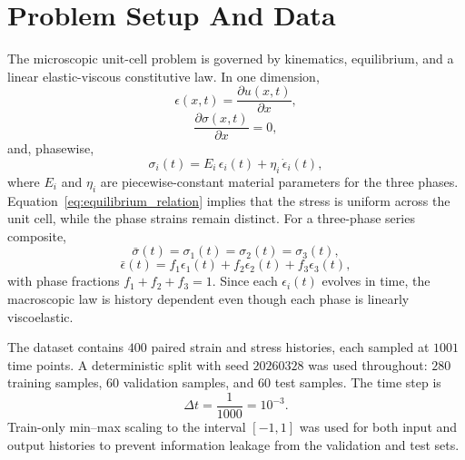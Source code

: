 \documentclass[11pt,a4paper]{article}
\newcommand{\epsbar}{\bar{\epsilon}}
\newcommand{\sigbar}{\bar{\sigma}}
\newcommand{\dt}{\Delta t}
\begin{document}
\section{Problem Setup And Data}

The microscopic unit-cell problem is governed by kinematics, equilibrium, and a linear elastic-viscous constitutive law. In one dimension,
\begin{equation}
\epsilon(x,t)=\frac{\partial u(x,t)}{\partial x},
\label{eq:kinematic_relation}
\end{equation}
\begin{equation}
\frac{\partial \sigma(x,t)}{\partial x}=0,
\label{eq:equilibrium_relation}
\end{equation}
and, phasewise,
\begin{equation}
\sigma_i(t)=E_i\,\epsilon_i(t)+\eta_i\,\dot{\epsilon}_i(t),
\label{eq:kelvin_voigt_phase}
\end{equation}
where $E_i$ and $\eta_i$ are piecewise-constant material parameters for the three phases. Equation~\eqref{eq:equilibrium_relation} implies that the stress is uniform across the unit cell, while the phase strains remain distinct. For a three-phase series composite,
\begin{equation}
\sigbar(t)=\sigma_1(t)=\sigma_2(t)=\sigma_3(t),
\label{eq:uniform_stress}
\end{equation}
\begin{equation}
\epsbar(t)=f_1\epsilon_1(t)+f_2\epsilon_2(t)+f_3\epsilon_3(t),
\label{eq:macro_strain_average}
\end{equation}
with phase fractions $f_1+f_2+f_3=1$. Since each $\epsilon_i(t)$ evolves in time, the macroscopic law is history dependent even though each phase is linearly viscoelastic.

The dataset contains $400$ paired strain and stress histories, each sampled at $1001$ time points. A deterministic split with seed $20260328$ was used throughout: $280$ training samples, $60$ validation samples, and $60$ test samples. The time step is
\begin{equation}
\dt=\frac{1}{1000}=10^{-3}.
\label{eq:dt_definition}
\end{equation}
Train-only min--max scaling to the interval $[-1,1]$ was used for both input and output histories to prevent information leakage from the validation and test sets.
\end{document}
